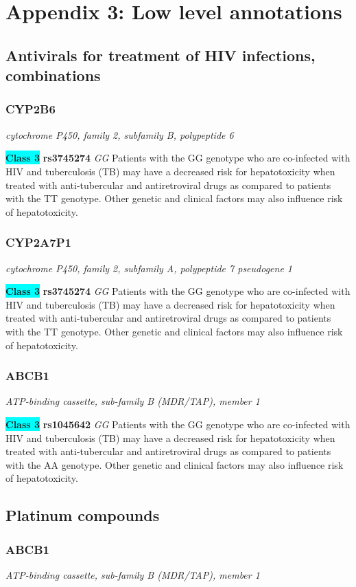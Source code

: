 \documentclass{report}
\begin{document}

\section{Appendix 3: Low level annotations}

\scriptsize\subsection{ Antivirals for treatment of HIV infections, combinations }\subsubsection{ CYP2B6 }
\textit{ cytochrome P450, family 2, subfamily B, polypeptide 6 }

\textbf{\colorbox{cyan} {Class 3}} \textbf{ rs3745274 } \textit{ GG }
Patients with the GG genotype who are co-infected with HIV and tuberculosis (TB) may have a decreased risk for hepatotoxicity when treated with anti-tubercular and antiretroviral drugs as compared to patients with the TT genotype. Other genetic and clinical factors may also influence risk of hepatotoxicity.\newline\subsubsection{ CYP2A7P1 }
\textit{ cytochrome P450, family 2, subfamily A, polypeptide 7 pseudogene 1 }

\textbf{\colorbox{cyan} {Class 3}} \textbf{ rs3745274 } \textit{ GG }
Patients with the GG genotype who are co-infected with HIV and tuberculosis (TB) may have a decreased risk for hepatotoxicity when treated with anti-tubercular and antiretroviral drugs as compared to patients with the TT genotype. Other genetic and clinical factors may also influence risk of hepatotoxicity.\newline\subsubsection{ ABCB1 }
\textit{ ATP-binding cassette, sub-family B (MDR/TAP), member 1 }

\textbf{\colorbox{cyan} {Class 3}} \textbf{ rs1045642 } \textit{ GG }
Patients with the GG genotype who are co-infected with HIV and tuberculosis (TB) may have a decreased risk for hepatotoxicity when treated with anti-tubercular and antiretroviral drugs as compared to patients with the AA genotype. Other genetic and clinical factors may also influence risk of hepatotoxicity.\newline\subsection{ Platinum compounds }\subsubsection{ ABCB1 }
\textit{ ATP-binding cassette, sub-family B (MDR/TAP), member 1 }
\end{document}
